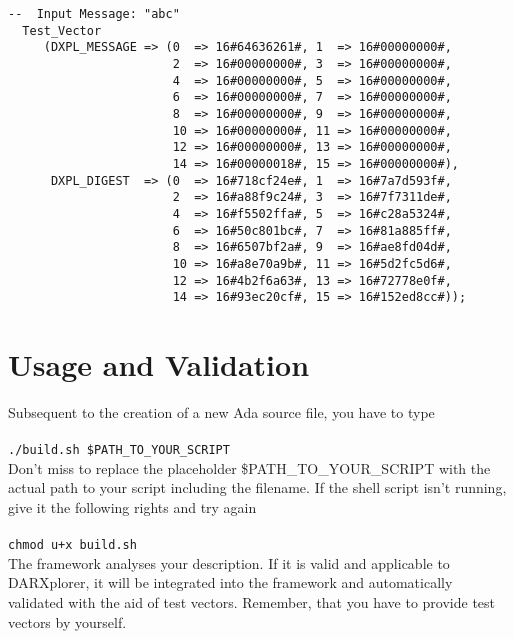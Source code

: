 \documentclass{acmtrans2m}
\begin{document}
\begin{lstlisting}[caption={Showing a test vector declaration in Ada},label=listing:testvector]
   --  Input Message: "abc"
  Test_Vector
     (DXPL_MESSAGE => (0  => 16#64636261#, 1  => 16#00000000#,
                       2  => 16#00000000#, 3  => 16#00000000#,
                       4  => 16#00000000#, 5  => 16#00000000#,
                       6  => 16#00000000#, 7  => 16#00000000#,
                       8  => 16#00000000#, 9  => 16#00000000#,
                       10 => 16#00000000#, 11 => 16#00000000#,
                       12 => 16#00000000#, 13 => 16#00000000#,
                       14 => 16#00000018#, 15 => 16#00000000#),
      DXPL_DIGEST  => (0  => 16#718cf24e#, 1  => 16#7a7d593f#,
                       2  => 16#a88f9c24#, 3  => 16#7f7311de#,
                       4  => 16#f5502ffa#, 5  => 16#c28a5324#,
                       6  => 16#50c801bc#, 7  => 16#81a885ff#,
                       8  => 16#6507bf2a#, 9  => 16#ae8fd04d#,
                       10 => 16#a8e70a9b#, 11 => 16#5d2fc5d6#,
                       12 => 16#4b2f6a63#, 13 => 16#72778e0f#,
                       14 => 16#93ec20cf#, 15 => 16#152ed8cc#));
\end{lstlisting}


\section{Usage and Validation}
Subsequent to the creation of a new Ada source file, you have to type\\ \\
\noindent\hspace*{12mm}%
\texttt{./build.sh \$PATH\_TO\_YOUR\_SCRIPT}\\

Don't miss to replace the placeholder \$PATH\_TO\_YOUR\_SCRIPT with the
actual path to your script including the filename. If the shell script 
isn't running, give it the following rights and try again\\ \\
\noindent\hspace*{12mm}%
\texttt{chmod u+x build.sh}\\

The framework analyses your description. If it is valid and 
applicable to DARXplorer, it will be integrated into the framework
and automatically validated with the aid of test vectors. Remember, that
you have to provide test vectors by yourself.
\end{document}
